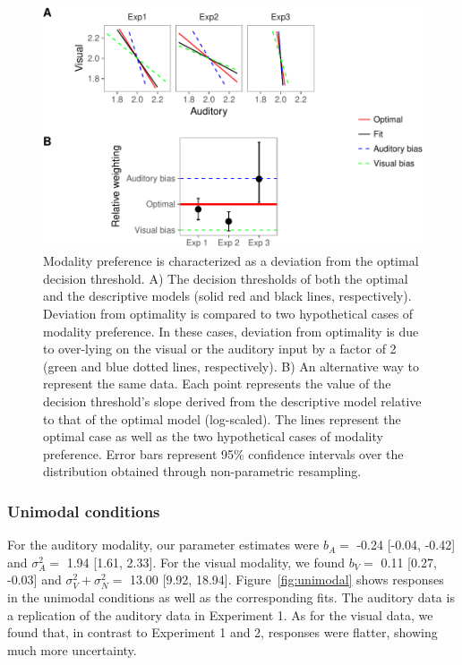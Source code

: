 \documentclass[english,floatsintext,man]{apa6}
\theoremstyle{definition}
\theoremstyle{definition}
\theoremstyle{definition}
\theoremstyle{remark}
\begin{document}
\begin{figure}[!h]
\includegraphics[width=\textwidth]{ms_files/figure-latex/bias-1} \caption{Modality preference is characterized as a deviation from the optimal decision threshold. A) The decision thresholds of both the optimal and the descriptive models (solid red and black lines, respectively). Deviation from optimality is compared to two hypothetical cases of modality preference. In these cases, deviation from  optimality is due to over-lying on the visual or the auditory input by a factor of 2 (green and blue dotted lines, respectively). B) An alternative way to represent the same data. Each point represents the value of the decision threshold's slope derived from the descriptive model relative to that of the optimal model (log-scaled). The lines represent the optimal case as well as the two hypothetical cases of modality preference. Error bars represent 95\% confidence intervals over the distribution obtained through non-parametric resampling.}\label{fig:bias}
\end{figure}

\subsubsection{Unimodal conditions}\label{unimodal-conditions-3}

For the auditory modality, our parameter estimates were \(b_A=\) -0.24
{[}-0.04, -0.42{]} and \(\sigma^2_A=\) 1.94 {[}1.61, 2.33{]}. For the
visual modality, we found \(b_V=\) 0.11 {[}0.27, -0.03{]} and
\(\sigma^2_V+\sigma^2_N=\) 13.00 {[}9.92, 18.94{]}.
Figure~\ref{fig:unimodal} shows responses in the unimodal conditions as
well as the corresponding fits. The auditory data is a replication of
the auditory data in Experiment 1. As for the visual data, we found
that, in contrast to Experiment 1 and 2, responses were flatter, showing
much more uncertainty.
\end{document}
